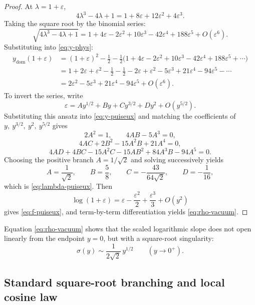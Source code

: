\begin{proof}
At $\lambda = 1 + \varepsilon$,
\[
4\lambda^3 - 4\lambda + 1
= 1 + 8\varepsilon + 12\varepsilon^2 + 4\varepsilon^3.
\]
Taking the square root by the binomial series:
\[
\sqrt{4\lambda^3 - 4\lambda + 1}
= 1 + 4\varepsilon - 2\varepsilon^2 + 10\varepsilon^3 - 42\varepsilon^4 + 188\varepsilon^5 + O(\varepsilon^6).
\]
Substituting into \eqref{eq:y-phys}:
\begin{align*}
y_{\mathrm{dom}}(1 + \varepsilon)
&= (1 + \varepsilon)^2 - \tfrac{1}{2}
  - \tfrac{1}{2}\bigl(1 + 4\varepsilon - 2\varepsilon^2 + 10\varepsilon^3 - 42\varepsilon^4 + 188\varepsilon^5 + \cdots\bigr) \\
&= 1 + 2\varepsilon + \varepsilon^2 - \tfrac{1}{2}
  - \tfrac{1}{2} - 2\varepsilon + \varepsilon^2 - 5\varepsilon^3 + 21\varepsilon^4 - 94\varepsilon^5 - \cdots \\
&= 2\varepsilon^2 - 5\varepsilon^3 + 21\varepsilon^4 - 94\varepsilon^5 + O(\varepsilon^6).
\end{align*}
To invert the series, write
\[
\varepsilon = A y^{1/2} + B y + C y^{3/2} + D y^2 + O(y^{5/2}).
\]
Substituting this ansatz into \eqref{eq:y-puiseux} and matching the coefficients of
\(
y,\ y^{3/2},\ y^2,\ y^{5/2}
\)
gives
\[
2A^2=1,\qquad 4AB-5A^3=0,
\]
\[
4AC+2B^2-15A^2B+21A^4=0,
\]
\[
4AD+4BC-15A^2C-15AB^2+84A^3B-94A^5=0.
\]
Choosing the positive branch \(A=1/\sqrt2\) and solving successively yields
\[
A=\frac{1}{\sqrt2},\qquad
B=\frac58,\qquad
C=-\frac{43}{64\sqrt2},\qquad
D=-\frac{1}{16},
\]
which is \eqref{eq:lambda-puiseux}.
Then
\[
\log(1+\varepsilon)=\varepsilon-\frac{\varepsilon^2}{2}+\frac{\varepsilon^3}{3}+O(y^2)
\]
gives \eqref{eq:f-puiseux}, and term-by-term differentiation yields \eqref{eq:rho-vacuum}.
\end{proof}

Equation \eqref{eq:rho-vacuum} shows that the scaled logarithmic slope does not open linearly from the endpoint \(y=0\), but with a square-root singularity:
\[
\sigma(y) \sim \frac{1}{2\sqrt{2}}\,y^{1/2}
\qquad (y \to 0^+).
\]

\subsection{Standard square-root branching and local cosine law}\label{subsec:vacuum-quantization}


